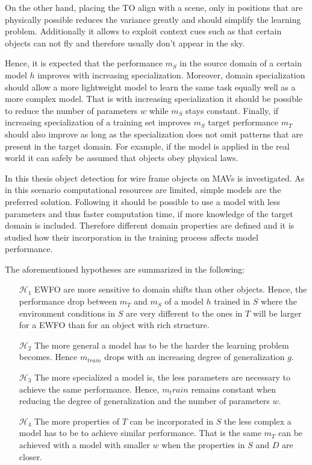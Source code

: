 On the other hand, placing the \ac{TO} align with a scene, only in positions that are physically possible reduces the variance greatly and should simplify the learning problem. Additionally it allows to exploit context cues such as that certain objects can not fly and therefore usually don't appear in the sky.

Hence, it is expected that the performance $m_{S}$ in the source domain  of a certain model $h$ improves with increasing specialization. Moreover, domain specialization should allow a more lightweight model to learn the same task equally well as a more complex model. That is with increasing specialization it should be possible to reduce the number of parameters $w$ while $m_{S}$ stays constant. Finally, if increasing specialization of a training set improves $m_{S}$ target performance $m_T$ should also improve as long as the specialization does not omit patterns that are present in the target domain. For example, if the model is applied in the real world it can safely be assumed that objects obey physical laws.

In this thesis object detection for wire frame objects on \acp{MAV} is investigated. As in this scenario computational resources are limited, simple models are the preferred solution. Following  it should be possible to use a model with less parameters and thus faster computation time, if more knowledge of the target domain is included. Therefore different domain properties are defined and it is studied how their incorporation in the training process affects model performance.

The aforementioned hypotheses are summarized in the following:

\begin{enumerate}
	\item[$\mathcal{H}_1$] \ac{EWFO} are more sensitive to domain shifts than other objects. Hence, the performance drop between $m_T$ and $m_S$ of a model $h$ trained in $S$ where the environment conditions in $S$ are very different to the ones in $T$ will be larger for a \ac{EWFO} than for an object with rich structure.
	
	\item[$\mathcal{H}_2$] The more general a model has to be the harder the learning problem becomes. Hence $m_{train}$ drops with an increasing degree of generalization $g$.
	
	\item[$\mathcal{H}_3$] The more specialized a model is, the less parameters are necessary to achieve the same performance. Hence, $m_train$ remains constant when reducing the degree of generalization and the number of parameters $w$.
	
	\item[$\mathcal{H}_4$] The more properties of $T$ can be incorporated in $S$ the less complex a model has to be to achieve similar performance. That is the same $m_T$ can be achieved with a model with smaller $w$ when the properties in $S$ and $D$ are closer.
\end{enumerate}







